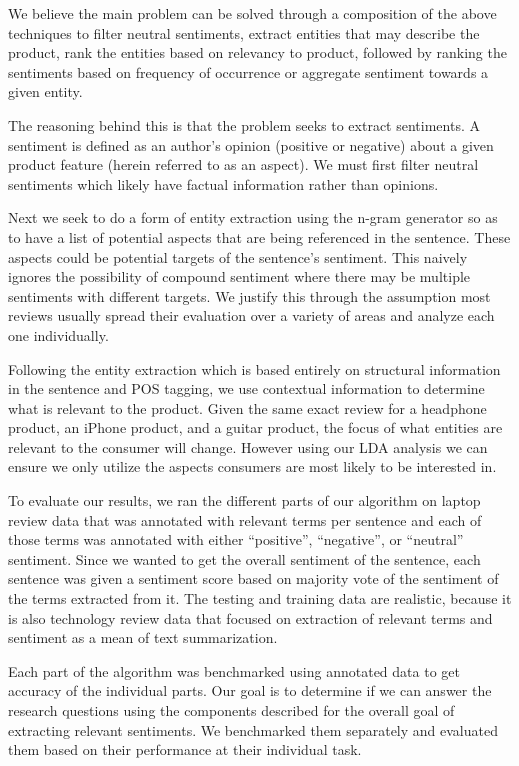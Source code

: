 \documentclass{article}
\begin{document}
We believe the main problem can be solved through a composition of the above techniques to filter neutral sentiments, extract entities that may describe the product, rank the entities based on relevancy to product, followed by ranking the sentiments based on frequency of occurrence or aggregate sentiment towards a given entity.  

The reasoning behind this is that the problem seeks to extract sentiments. A sentiment is defined as an author’s opinion (positive or negative) about a given product feature (herein referred to as an aspect). We must first filter neutral sentiments which likely have factual information rather than opinions.

Next we seek to do a form of entity extraction using the n-gram generator so as to have a list of potential aspects that are being referenced in the sentence. These aspects could be potential targets of the sentence’s sentiment. This naively ignores the possibility of compound sentiment where there may be multiple sentiments with different targets. We justify this through the assumption most reviews usually spread their evaluation over a variety of areas and analyze each one individually.

Following the entity extraction which is based entirely on structural information in the sentence and POS tagging, we use contextual information to determine what is relevant to the product. Given the same exact review for a headphone product, an iPhone product, and a guitar product, the focus of what entities are relevant to the consumer will change. However using our LDA analysis we can ensure we only utilize the aspects consumers are most likely to be interested in.

To evaluate our results, we ran the different parts of our algorithm on laptop review data that was annotated with relevant terms per sentence and each of those terms was annotated with either “positive”, “negative”, or “neutral” sentiment. Since we wanted to get the overall sentiment of the sentence, each sentence was given a sentiment score based on majority vote of the sentiment of the terms extracted from it. The testing and training data are realistic, because it is also technology review data that focused on extraction of relevant terms and sentiment as a mean of text summarization. 

Each part of the algorithm was benchmarked using annotated data to get accuracy of the individual parts. Our goal is to determine if we can answer the research questions using the components described for the overall goal of extracting relevant sentiments. We benchmarked them separately and evaluated them based on their performance at their individual task.
\end{document}
